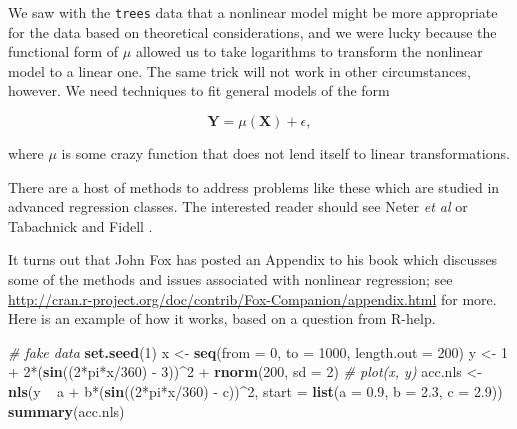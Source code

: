 \documentclass[]{book}
\newenvironment{Shaded}{\begin{snugshade}}{\end{snugshade}}
\newcommand{\KeywordTok}[1]{\textcolor[rgb]{0.13,0.29,0.53}{\textbf{{#1}}}}
\newcommand{\DataTypeTok}[1]{\textcolor[rgb]{0.13,0.29,0.53}{{#1}}}
\newcommand{\DecValTok}[1]{\textcolor[rgb]{0.00,0.00,0.81}{{#1}}}
\newcommand{\FloatTok}[1]{\textcolor[rgb]{0.00,0.00,0.81}{{#1}}}
\newcommand{\StringTok}[1]{\textcolor[rgb]{0.31,0.60,0.02}{{#1}}}
\newcommand{\CommentTok}[1]{\textcolor[rgb]{0.56,0.35,0.01}{\textit{{#1}}}}
\newcommand{\NormalTok}[1]{{#1}}
\numberwithin{equation}{chapter}
\numberwithin{figure}{chapter}
\theoremstyle{plain}
\theoremstyle{definition}
\theoremstyle{remark}
\theoremstyle{definition}
\theoremstyle{definition}
\theoremstyle{remark}
\begin{document}
We saw with the \texttt{trees} data that a nonlinear model might be more
appropriate for the data based on theoretical considerations, and we
were lucky because the functional form of \(\mu\) allowed us to take
logarithms to transform the nonlinear model to a linear one. The same
trick will not work in other circumstances, however. We need techniques
to fit general models of the form

\begin{equation}
\mathbf{Y}=\mu(\mathbf{X})+\epsilon,
\end{equation}

where \(\mu\) is some crazy function that does not lend itself to linear
transformations.

There are a host of methods to address problems like these which are
studied in advanced regression classes. The interested reader should see
Neter \emph{et al} \autocite{Neter1996} or Tabachnick and Fidell
\autocite{Tabachnick2006}.

It turns out that John Fox has posted an Appendix to his book
\autocite{Fox2002} which discusses some of the methods and issues
associated with nonlinear regression; see
\url{http://cran.r-project.org/doc/contrib/Fox-Companion/appendix.html}
for more. Here is an example of how it works, based on a question from
R-help.

\begin{Shaded}
\begin{Highlighting}[]
\CommentTok{# fake data }
\KeywordTok{set.seed}\NormalTok{(}\DecValTok{1}\NormalTok{) }
\NormalTok{x <-}\StringTok{ }\KeywordTok{seq}\NormalTok{(}\DataTypeTok{from =} \DecValTok{0}\NormalTok{, }\DataTypeTok{to =} \DecValTok{1000}\NormalTok{, }\DataTypeTok{length.out =} \DecValTok{200}\NormalTok{) }
\NormalTok{y <-}\StringTok{ }\DecValTok{1} \NormalTok{+}\StringTok{ }\DecValTok{2}\NormalTok{*(}\KeywordTok{sin}\NormalTok{((}\DecValTok{2}\NormalTok{*pi*x/}\DecValTok{360}\NormalTok{) -}\StringTok{ }\DecValTok{3}\NormalTok{))^}\DecValTok{2} \NormalTok{+}\StringTok{ }\KeywordTok{rnorm}\NormalTok{(}\DecValTok{200}\NormalTok{, }\DataTypeTok{sd =} \DecValTok{2}\NormalTok{)}
\CommentTok{# plot(x, y)}
\NormalTok{acc.nls <-}\StringTok{ }\KeywordTok{nls}\NormalTok{(y ~}\StringTok{ }\NormalTok{a +}\StringTok{ }\NormalTok{b*(}\KeywordTok{sin}\NormalTok{((}\DecValTok{2}\NormalTok{*pi*x/}\DecValTok{360}\NormalTok{) -}\StringTok{ }\NormalTok{c))^}\DecValTok{2}\NormalTok{, }
               \DataTypeTok{start =} \KeywordTok{list}\NormalTok{(}\DataTypeTok{a =} \FloatTok{0.9}\NormalTok{, }\DataTypeTok{b =} \FloatTok{2.3}\NormalTok{, }\DataTypeTok{c =} \FloatTok{2.9}\NormalTok{))}
\KeywordTok{summary}\NormalTok{(acc.nls)}
\end{Highlighting}
\end{Shaded}
\end{document}
